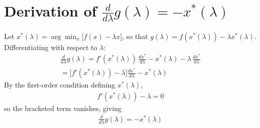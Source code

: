 \documentclass[11pt,a4paper,twoside]{scrartcl} %
\begin{document}
\printbibliography

\appendix
\section{Derivation of $\frac{d}{d\lambda}g(\lambda) = -x^*(\lambda)$}
\label{app:envelope}

Let $x^*(\lambda) = \arg\min_x \big[f(x) - \lambda x\big]$, so that
$g(\lambda) = f(x^*(\lambda)) - \lambda x^*(\lambda)$. Differentiating
with respect to $\lambda$:
\begin{gather*}
    \frac{d}{d\lambda}g(\lambda)
    = f'(x^*(\lambda))\,\frac{dx^*}{d\lambda} - x^*(\lambda) - \lambda\,\frac{dx^*}{d\lambda} \\
    = \Big[f'(x^*(\lambda)) - \lambda\Big]\frac{dx^*}{d\lambda} - x^*(\lambda)
\end{gather*}
By the first-order condition defining $x^*(\lambda)$,
\begin{gather*}
    f'(x^*(\lambda)) - \lambda = 0
\end{gather*}
so the bracketed term vanishes, giving
\begin{gather*}
    \frac{d}{d\lambda}g(\lambda) = -x^*(\lambda)
\end{gather*}
\end{document}
